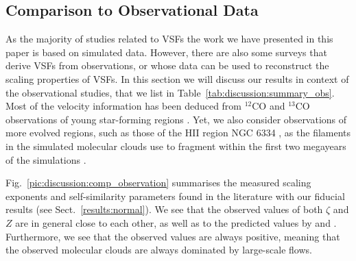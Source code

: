 \subsection{Comparison to Observational Data}\label{discussion:observation}


As the majority of studies related to VSFs the work we have presented in this paper is based on simulated data.
However, there are also some surveys that derive VSFs from observations, or whose data can be used to reconstruct the scaling properties of VSFs. 
In this section we will discuss our results in context of the observational studies, that we list in Table~\ref{tab:discussion:summary_obs}.
Most of the velocity information has been deduced from $^{12}$CO and $^{13}$CO observations of young star-forming regions \citep[e.g., Perseus and Taurus][]{Padoan2003}.
Yet, we also consider observations of more evolved regions, such as those of the HII region NGC 6334 \citep{Zernickel2015}, as the filaments in the simulated molecular clouds use to fragment within the first two megayears of the simulations .



Fig.~\ref{pic:discussion:comp_observation} summarises the measured scaling exponents and self-similarity parameters found in the literature with our fiducial results (see Sect.~\ref{results:normal}).
We see that the observed values of both $\zeta$ and $Z$ are in general close to each other, as well as to the predicted values by \citet{She1994} and \citet{Boldyrev2002}. 
Furthermore, we see that the observed values are always positive, meaning that the observed molecular clouds are always dominated by large-scale flows.

